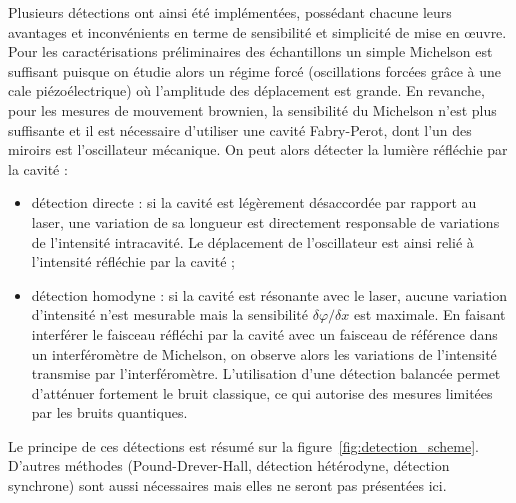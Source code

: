 \documentclass[12pt,a4paper]{article}
\begin{document}
Plusieurs détections ont ainsi été implémentées, possédant chacune leurs avantages et inconvénients en terme de sensibilité et simplicité de mise en œuvre.
Pour les caractérisations préliminaires des échantillons un simple Michelson est suffisant puisque on étudie alors un régime forcé (oscillations forcées grâce à une cale piézoélectrique) où l'amplitude des déplacement est grande.
En revanche, pour les mesures de mouvement brownien, la sensibilité du Michelson n'est plus suffisante et il est nécessaire d'utiliser une cavité Fabry-Perot, dont l'un des miroirs est l'oscillateur mécanique.
On peut alors détecter la lumière réfléchie par la cavité :
\begin{itemize}
\item détection directe : si la cavité est légèrement désaccordée par rapport au laser, une variation de sa longueur est directement responsable de variations de l'intensité intracavité.
Le déplacement de l'oscillateur est ainsi relié à l'intensité réfléchie par la cavité ;
\item détection homodyne : si la cavité est résonante avec le laser, aucune variation d'intensité n'est mesurable mais la sensibilité $\delta\varphi/\delta x$ est maximale.
En faisant interférer le faisceau réfléchi par la cavité avec un faisceau de référence dans un interféromètre de Michelson, on observe alors les variations de l'intensité transmise par l'interféromètre.
L'utilisation d'une détection balancée permet d'atténuer fortement le bruit classique, ce qui autorise des mesures limitées par les bruits quantiques. 
\end{itemize}
Le principe de ces détections est résumé sur la figure~\ref{fig:detection_scheme}.
D'autres méthodes (Pound-Drever-Hall, détection hétérodyne, détection synchrone) sont aussi nécessaires mais elles ne seront pas présentées ici.
\end{document}
